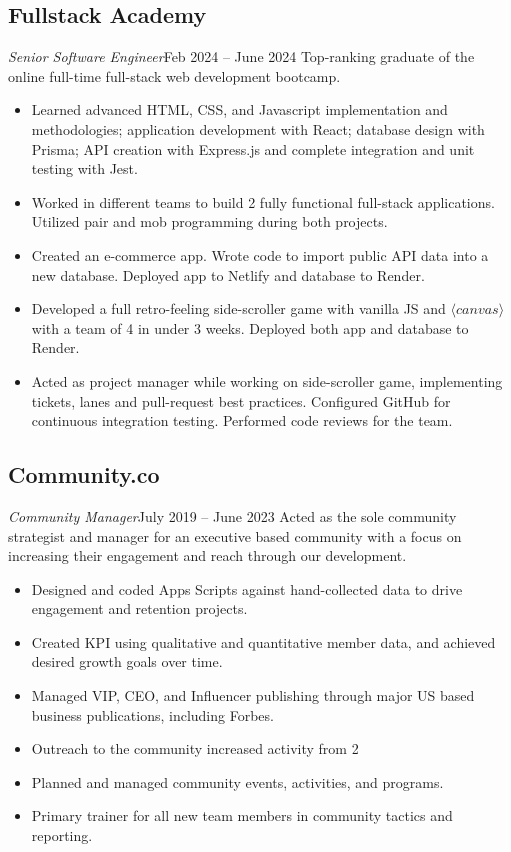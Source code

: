 \documentclass[10.5pt, oneside]{memoir}
\newcommand{\employer}[2]{
    \subsection{#1\hfill\normalsize\mdseries{#2}}}
\newcommand{\position}[2]{
    \textit{#1}\hfill{#2}}
\begin{document}
\employer{Fullstack Academy}{Remote}
\position{Senior Software Engineer}{Feb 2024 -- June 2024}
Top-ranking graduate of the online full-time full-stack web development
bootcamp.
\begin{itemize}
    \item Learned advanced HTML, CSS, and Javascript implementation and
          methodologies; application development with React; database design
          with Prisma;
          API creation with Express.js and complete integration and unit
          testing with
          Jest.
    \item Worked in different teams to build 2 fully functional full-stack
          applications. Utilized pair and mob programming during both projects.
    \item Created an e-commerce app. Wrote code to import public API data
          into a
          new database. Deployed app to Netlify and database to Render.
    \item Developed a full retro-feeling side-scroller game with vanilla
          JS and
          $\langle canvas \rangle$ with a team of 4 in under 3 weeks.
          Deployed
          both app and
          database to
          Render.
    \item Acted as project manager while working on side-scroller game,
          implementing tickets, lanes and pull-request best practices.
          Configured GitHub
          for continuous integration testing. Performed code reviews for the
          team.\\
\end{itemize}

\employer{Community.co}{Remote}
\position{Community Manager}{July 2019 -- June 2023}
Acted as the sole community strategist and manager for an executive based
community with a focus on increasing their engagement and reach through our
development.
\begin{itemize}
    \item Designed and coded Apps Scripts against hand-collected data to drive
          engagement and retention projects.
    \item Created KPI using qualitative and quantitative member data, and
          achieved
          desired growth goals over time.
    \item Managed VIP, CEO, and Influencer publishing through major US
          based
          business publications, including Forbes.
    \item Outreach to the community increased activity from
          2%
    \item Planned and managed community events, activities, and programs.
    \item Primary trainer for all new team members in community tactics
          and
          reporting.\\
\end{itemize}
\end{document}
